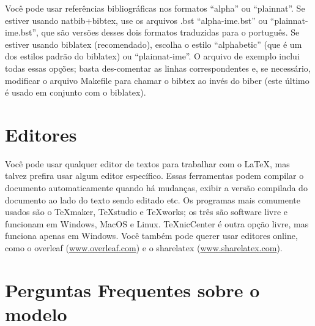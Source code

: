 Você pode usar referências bibliográficas nos formatos ``alpha'' ou ``plainnat''.
Se estiver usando natbib+bibtex, use os arquivos .bst ``alpha-ime.bst'' ou
``plainnat-ime.bst'', que são versões desses dois formatos traduzidas para o
português. Se estiver usando biblatex (recomendado), escolha o estilo
``alphabetic'' (que é um dos estilos padrão do biblatex) ou ``plainnat-ime''.
O arquivo de exemplo inclui todas essas opções; basta des-comentar as linhas
correspondentes e, se necessário, modificar o arquivo Makefile para chamar
o bibtex ao invés do biber (este último é usado em conjunto com o biblatex).

\section{Editores}

Você pode usar qualquer editor de textos para trabalhar com o \LaTeX{}, mas
talvez prefira usar algum editor específico. Essas ferramentas podem compilar
o documento automaticamente quando há mudanças, exibir a versão compilada
do documento ao lado do texto sendo editado etc. Os programas mais comumente
usados são o TeXmaker, TeXstudio e TeXworks; os três são software livre e
funcionam em Windows, MacOS e Linux. TeXnicCenter é outra opção livre, mas
funciona apenas em Windows. Você também pode querer usar editores online,
como o overleaf (\url{www.overleaf.com}) e o sharelatex (\url{www.sharelatex.com}).

\section{Perguntas Frequentes sobre o modelo}

